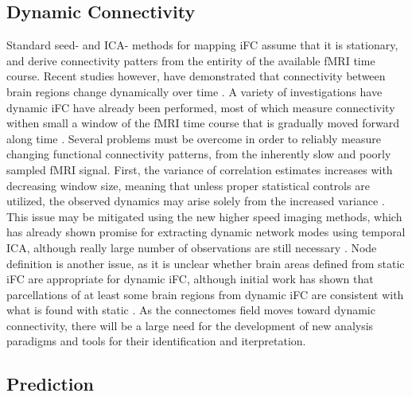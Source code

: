 \subsection{Dynamic Connectivity}

Standard seed- and ICA- methods for mapping iFC assume that it is stationary, and derive connectivity patters from the entirity of the available fMRI time course. Recent studies however, have demonstrated that connectivity between brain regions change dynamically over time \cite{Chang, Keilholz, Hutchinson2013, Fu2013}. A variety of investigations have dynamic iFC have already been performed, most of which measure connectivity withen small a window of the fMRI time course that is gradually moved forward along time \cite{}. Several problems must be overcome in order to reliably measure changing functional connectivity patterns, from the inherently slow and poorly sampled fMRI signal. First, the variance of correlation estimates increases with decreasing window size, meaning that unless proper statistical controls are utilized, the observed dynamics may arise solely from the increased variance \cite{}. This issue may be mitigated using the new higher speed imaging methods, which has already shown promise for extracting dynamic network modes using temporal ICA, although really large number of observations are still necessary \cite{Smith2012}. Node definition is another issue, as it is unclear whether brain areas defined from static iFC are appropriate for dynamic iFC, although initial work has shown that parcellations of at least some brain regions from dynamic iFC are consistent with what is found with static \cite{Yang2013}. As the connectomes field moves toward dynamic connectivity, there will be a large need for the development of new analysis paradigms and tools for their identification and iterpretation. 

\subsection{Prediction}

